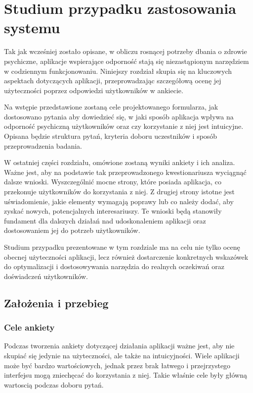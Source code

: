 \chapter{Studium przypadku zastosowania systemu}
Tak jak wcześniej zostało opisane, w obliczu rosnącej potrzeby dbania o zdrowie 
psychiczne, aplikacje wspierające odporność stają się niezastąpionym 
narzędziem w codziennym funkcjonowaniu. Niniejszy rozdział skupia się na 
kluczowych aspektach dotyczących aplikacji, przeprowadzając szczegółową 
ocenę jej użyteczności poprzez odpowiedzi użytkowników w ankiecie. 

Na wstępie przedstawione zostaną cele projektowanego formularza, jak dostosowano pytania aby 
dowiedzieć się, w jaki sposób aplikacja wpływa na odporność psychiczną
użytkowników oraz czy korzystanie z niej jest intuicyjne. Opisana będzie struktura 
pytań, kryteria doboru uczestników i sposób przeprowadzenia badania.

W ostatniej części rozdziału, omówione zostaną wyniki ankiety i ich 
analiza. Ważne jest, aby na podstawie tak przeprowadzonego kwestionariusza wyciągnąć
dalsze wnioski. Wyszczególnić mocne strony, które posiada aplikacja, co przekonuje 
użytkowników do korzystania z niej. Z drugiej strony istotne jest uświadomienie, jakie 
elementy wymagają poprawy lub co należy dodać, aby zyskać nowych, potencjalnych 
interesariuszy. Te wnioski będą stanowiły fundament dla dalszych działań nad udoskonaleniem
aplikacji oraz dostosowaniem jej do potrzeb użytkowników.

Studium przypadku prezentowane w tym rozdziale ma na celu nie tylko ocenę obecnej
użyteczności aplikacji, lecz również dostarczenie konkretnych wskazówek do
optymalizacji i dostosowywania narzędzia do realnych oczekiwań oraz
doświadczeń użytkowników.

\section{Założenia i przebieg}
\subsection{Cele ankiety}
Podczas tworzenia ankiety dotyczącej działania aplikacji ważne jest, aby
nie skupiać się jedynie na użyteczności, ale także na intuicyjności. Wiele 
aplikacji może być bardzo wartościowych, jednak przez brak łatwego i przejrzystego
interfejsu mogą zniechęcać do korzystania z niej. Takie właśnie cele 
były główną wartoscią podczas doboru pytań. 

